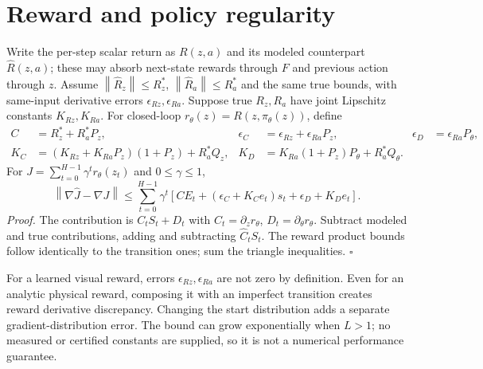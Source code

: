 \documentclass{article}
\newcommand{\norm}[1]{\left\|#1\right\|}
\begin{document}
\section{Reward and policy regularity}
Write the per-step scalar return as $R(z,a)$ and its modeled counterpart $\widehat R(z,a)$; these may absorb next-state rewards through $F$ and previous action through $z$. Assume $\norm{\widehat R_z}\le R_z^*$, $\norm{\widehat R_a}\le R_a^*$ and the same true bounds, with same-input derivative errors $\epsilon_{Rz},\epsilon_{Ra}$. Suppose true $R_z,R_a$ have joint Lipschitz constants $K_{Rz},K_{Ra}$. For closed-loop $r_\theta(z)=R(z,\pi_\theta(z))$, define
\begin{align*}
C&=R_z^*+R_a^*P_z,&
\epsilon_C&=\epsilon_{Rz}+\epsilon_{Ra}P_z,&
\epsilon_D&=\epsilon_{Ra}P_\theta,\\
K_C&=(K_{Rz}+K_{Ra}P_z)(1+P_z)+R_a^*Q_z,&
K_D&=K_{Ra}(1+P_z)P_\theta+R_a^*Q_\theta.
\end{align*}
For $J=\sum_{t=0}^{H-1}\gamma^t r_\theta(z_t)$ and $0\le\gamma\le1$,
\begin{equation}
\norm{\nabla\widehat J-\nabla J}\le\sum_{t=0}^{H-1}\gamma^t\left[CE_t+(\epsilon_C+K_Ce_t)s_t+\epsilon_D+K_De_t\right].
\end{equation}
\textit{Proof.} The contribution is $C_tS_t+D_t$ with $C_t=\partial_zr_\theta$, $D_t=\partial_\theta r_\theta$. Subtract modeled and true contributions, adding and subtracting $\widehat C_tS_t$. The reward product bounds follow identically to the transition ones; sum the triangle inequalities. $\square$

For a learned visual reward, errors $\epsilon_{Rz},\epsilon_{Ra}$ are not zero by definition. Even for an analytic physical reward, composing it with an imperfect transition creates reward derivative discrepancy. Changing the start distribution adds a separate gradient-distribution error. The bound can grow exponentially when $L>1$; no measured or certified constants are supplied, so it is not a numerical performance guarantee.
\end{document}

